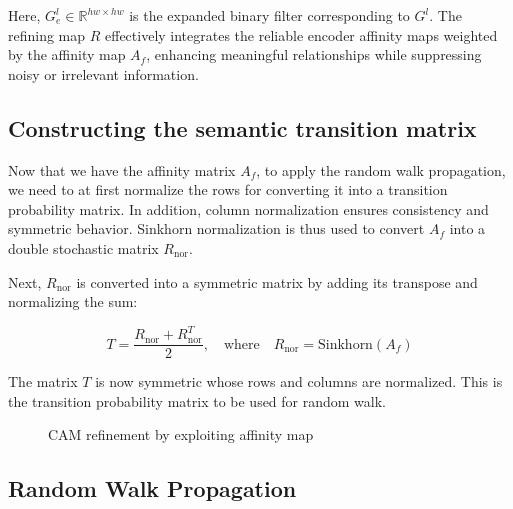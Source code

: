 Here, $G^l_e \in \mathbb{R}^{hw \times hw}$ is the expanded binary filter corresponding to $G^l$. The refining map $R$ effectively integrates the reliable encoder affinity maps weighted by the affinity map $A_f$, enhancing meaningful relationships while suppressing noisy or irrelevant information.

\subsection{Constructing the semantic transition matrix}
\label{subsec:trans_mat}
Now that we have the affinity matrix $A_f$, to apply the random walk propagation, we need to at first normalize the rows for converting it into a transition probability matrix. In addition, column normalization ensures consistency and symmetric behavior. Sinkhorn normalization \cite{math_sinkhorn} is thus used to convert $A_f$ into a double stochastic matrix $R_{\text{nor}}$.

Next, $R_{\text{nor}}$ is converted into a symmetric matrix by adding its transpose and normalizing the sum:

\[
    T = \frac{R_{\text{nor}} + R_{\text{nor}}^T}{2}, \quad \text{where} \quad R_{\text{nor}} = \text{Sinkhorn}(A_f)
\]

The matrix $T$ is now symmetric whose rows and columns are normalized. This is the transition probability matrix to be used for random walk.


\begin{figure}[tbp]
    \centering
    \caption{CAM refinement by exploiting affinity map}
    \label{fig:refinement}
\end{figure}

\subsection{Random Walk Propagation}
\label{subsec:random_walk}


